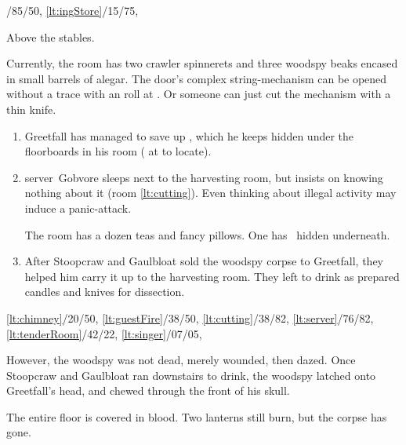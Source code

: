 \documentclass[10pt,twoside]{book}
\begin{document}
%
  {%
    /85/50,%
    \ref{lt:ingStore}/15/75,
  }%
{Above the stables.\par}
Currently, the room has two \gls{crawler} spinnerets and three \gls{woodspy} beaks encased in small barrels of alegar.
The door's complex string-mechanism can be opened without a trace with an  roll at \tn[9].
Or someone can just cut the mechanism with a thin knife.

\begin{enumerate}\itemsep0em
  \item
  Greetfall has managed to save up \lootBig, which he keeps hidden under the floorboards in his room ( at \tn[10] to locate).
  \label{lt:tenderRoom}
  \item
  \Gls{server}~Gobvore sleeps next to the \gls{harvesting} room, but insists on knowing nothing about it (room \vref{lt:cutting}).
  \label{lt:server}
  Even thinking about illegal activity may induce a panic-attack.

  The room has a dozen teas and fancy pillows.
  One has \lootMedium\ hidden underneath.
  \item
  \label{lt:cutting}
  After Stoopcraw and Gaulbloat sold the \gls{woodspy} corpse to Greetfall, they helped him carry it up to the \gls{harvesting} room.
  They left to drink as prepared candles and knives for dissection.
  \setcounter{diceNo}{\value{enumi}}
\end{enumerate}

%
{%
  \ref{lt:chimney}/20/50,
  \ref{lt:guestFire}/38/50,
  \ref{lt:cutting}/38/82,
  \ref{lt:server}/76/82,
  \ref{lt:tenderRoom}/42/22,
  \ref{lt:singer}/07/05,
}%
{}

However, the \gls{woodspy} was not dead, merely wounded, then dazed.
Once Stoopcraw and Gaulbloat ran downstairs to drink, the \gls{woodspy} latched onto Greetfall's head, and chewed through the front of his skull.

The entire floor is covered in blood.
Two lanterns still burn, but the corpse has gone.

\end{document}
